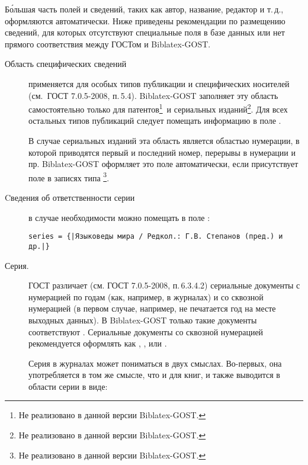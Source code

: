\documentclass[11pt,a4paper,headings=small,numbers=enddot]{ltxdockit}[2011/03/25]
\newcommand*{\biblatex}{Biblatex\xspace}
\newcommand*{\biblatexgost}{\biblatex-GOST\xspace}
\newcommand*{\gostname}{ГОСТ 7.0.5-2008}
\newcommand*{\gostref}[1]{\gostname, п.\,#1}
\newcommand*{\notimpl}{\footnote{Не реализовано в данной версии \biblatexgost.}}
\begin{document}
Б\'{о}льшая часть полей и сведений, таких как автор, название, редактор и т.\,д., оформляются
автоматически. 
Ниже приведены рекомендации по размещению сведений, для которых отсутствуют
специальные поля в базе данных или нет прямого соответствия между ГОСТом и \biblatexgost.

\begin{description}
%
%
\item[Область специфических сведений] применяется для
особых типов публикации и специфических носителей (см.~\gostref{5.4}). 
\biblatexgost заполняет эту 
область самостоятельно только для патентов\notimpl\ и сериальных изданий\notimpl. 
Для всех остальных типов публикаций
следует помещать информацию в поле . 


В случае сериальных изданий эта область является областью нумерации, в которой приводятся 
первый и последний номер, перерывы в нумерации и пр. \biblatexgost оформляет это поле 
автоматически, если присутствует поле  в записях типа \notimpl.

\item[Cведения об ответственности серии] в случае необходимости можно помещать 
в поле :  
\begin{lstlisting}[style=bibtex,escapechar=|]
series = {|Языковеды мира / Редкол.: Г.В. Степанов (пред.) и др.|}
\end{lstlisting}

\item[Серия.] \label{series}ГОСТ различает (см. \gostref{6.3.4.2}) сериальные документы 
с нумерацией по годам 
(как, например, в журналах) и со сквозной нумерацией (в первом случае, например, 
не печатается год на месте выходных данных). В \biblatexgost только такие документы соответствуют .  Сериальные документы со сквозной нумерацией рекомендуется оформлять как , ,  или . 

Серия в журналах может пониматься в двух смыслах. Во-первых, она употребляется в
том же смысле, что и для книг, и также выводится в области серии в виде:


\end{description}
\end{document}
